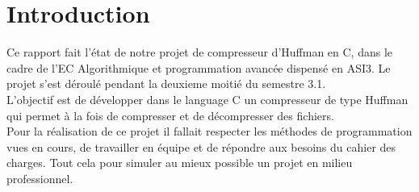 \chapter{Introduction}

Ce rapport fait l'état de notre projet de compresseur d'Huffman en  C, dans le cadre de l'EC Algorithmique et programmation avancée dispensé en ASI3.
Le projet s'est d\'{e}roul\'{e} pendant la deuxieme moiti\'{e} du semestre 3.1.\\

L'objectif est de développer dans le language C un compresseur de type Huffman qui permet à la fois de compresser et de décompresser des fichiers.\\

Pour la r\'{e}alisation de ce projet il fallait respecter les m\'{e}thodes de programmation vues en cours, de travailler en \'{e}quipe et de r\'{e}pondre aux besoins du cahier des charges. Tout cela pour simuler au mieux possible un projet en milieu professionnel.  \\